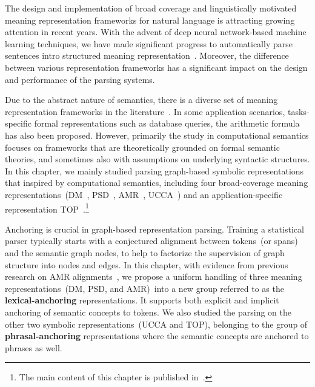 The design and implementation of broad coverage and linguistically
motivated meaning representation frameworks for natural language is
attracting growing attention in recent years. With the advent of deep
neural network-based machine learning techniques, we have made
significant progress to automatically parse sentences intro structured
meaning
representation~\citep{Oep:Kuh:Miy:14,Oep:Kuh:Miy:15,May:2016wc,hershcovich-etal-2019-semeval}. Moreover,
the difference between various representation frameworks has a
significant impact on the design and performance of the parsing
systems.

Due to the abstract nature of semantics, there is a diverse set of
meaning representation frameworks in the
literature~\citep{abend2017state}. In some application scenarios,
tasks-specific formal representations such as database queries, the
arithmetic formula has also been proposed. However, primarily the
study in computational semantics focuses on frameworks that are
theoretically grounded on formal semantic theories, and sometimes also
with assumptions on underlying syntactic structures. In this chapter,
we mainly studied parsing graph-based symbolic representations that
inspired by computational semantics, including four broad-coverage
meaning representations~(DM~\citep{Iva:Oep:Ovr:12},
PSD~\citep{hajic2012announcing,miyao2014house},
AMR~\citet{Ban:Bon:Cai:13}, UCCA~\cite{Abe:Rap:13b}) and an
application-specific representation
TOP~\citep{gupta-etal-2018-semantic-parsing}.\footnote{The main
  content of this chapter is published in~\citet{cao2019amazon}.}

Anchoring is crucial in graph-based representation parsing. Training a
statistical parser typically starts with a conjectured alignment
between tokens~(or spans) and the semantic graph nodes, to help to
factorize the supervision of graph structure into nodes and edges. In
this chapter, with evidence from previous research on AMR
alignments~\citep{Pourdamghani:2014aligning,Flanigan:2014vc,Wang:2017vt,chen2017unsupervised,szubert2018structured,lyu2018amr},
we propose a uniform handling of three meaning representations~(DM,
PSD, and AMR)~into a new group referred to as the
\textbf{lexical-anchoring} representations. It supports both explicit
and implicit anchoring of semantic concepts to tokens. We also studied
the parsing on the other two symbolic representations~(UCCA and TOP),
belonging to the group of \textbf{phrasal-anchoring} representations
where the semantic concepts are anchored to phrases as well.


